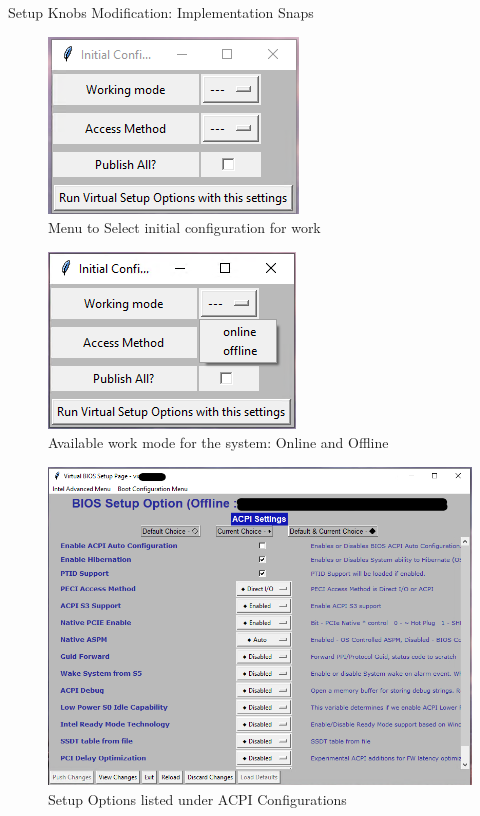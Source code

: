 \begin{frame}[allowframebreaks]{Setup Knobs Modification: Implementation Snaps}
    
    \begin{figure}[htbp]
        \centering
        \includegraphics[width=0.6\linewidth]{Im/figures/proposed-work/bios-gui-initial-config}
        \caption{Menu to Select initial configuration for work}\label{fig:proposed-work-bios-gui-initial-config}
    \end{figure}
    
    \begin{figure}[htbp]
        \centering
        \includegraphics[width=0.6\linewidth]{Im/figures/proposed-work/bios-gui-initial-config-select-mode}
        \caption{Available work mode for the system: Online and Offline}\label{fig:proposed-work-bios-gui-initial-config-select-mode}
    \end{figure}

    \begin{figure}[htbp]
        \centering
        \includegraphics[width=0.6\linewidth]{Im/figures/proposed-work/bios-gui-acpi-knobs}
        \caption{Setup Options listed under ACPI Configurations}\label{fig:proposed-work-bios-gui-acpi-knobs}
    \end{figure}


\end{frame}
